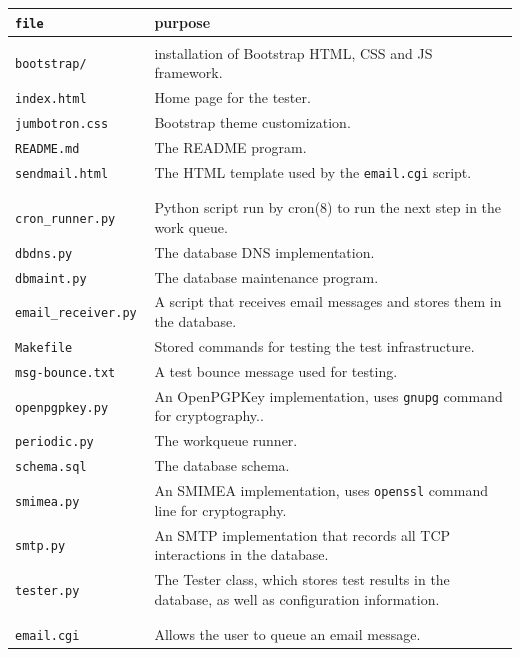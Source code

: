 \documentclass[preprint,3p]{elsarticle}
\begin{document}
\begin{table}
\begin{tabularx}{\textwidth}{>{\tt}lX}
\textrm{file} & purpose\\
\hline
\multicolumn{2}{l}{\textbf{HTML files:}}\\
bootstrap/         & installation of Bootstrap HTML, CSS and JS framework.\\
index.html         & Home page for the tester.\\
jumbotron.css      & Bootstrap theme customization.\\
README.md          & The README program.\\
sendmail.html      & The HTML template used by the \texttt{email.cgi} script.\\
\\
\multicolumn{2}{l}{\textbf{Python Modules and Scripts:}}\\
cron\_runner.py    & Python script run by cron(8) to run the next step in the work queue.  \\
dbdns.py           & The database DNS implementation.\\
dbmaint.py         & The database maintenance program.\\
email\_receiver.py & A script that receives email messages and stores them in the database.\\
Makefile           & Stored commands for testing the test infrastructure.\\
msg-bounce.txt     & A test bounce message used for testing.\\
openpgpkey.py      & An OpenPGPKey implementation, uses \texttt{gnupg} command for cryptography..\\
periodic.py        & The workqueue runner.\\
schema.sql         & The database schema.\\
smimea.py          & An SMIMEA implementation, uses \texttt{openssl} command line for cryptography.\\ 
smtp.py            & An SMTP implementation that records all TCP interactions in the database.\\
tester.py          & The Tester class, which stores test results in the database, as well as configuration information.\\
\\
\multicolumn{2}{l}{\textbf{CGI Scripts:}}\\
email.cgi         & Allows the user to queue an email message.\\

\end{tabularx}
\end{table}
\end{document}
